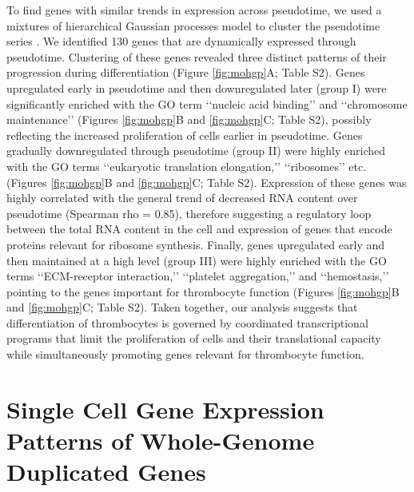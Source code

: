 To find genes with similar trends in expression across pseudotime, we used a mixtures of hierarchical Gaussian processes model to cluster the pseudotime series \cite{Hensman2015-op}. We identified 130 genes that are dynamically expressed through pseudotime. Clustering of these genes revealed three distinct patterns of their progression during differentiation (Figure \ref{fig:mohgp}A; Table S2). Genes upregulated early in pseudotime and then downregulated later (group I) were significantly enriched with the GO term ‘‘nucleic acid binding’’ and ‘‘chromosome maintenance’’ (Figures \ref{fig:mohgp}B and \ref{fig:mohgp}C; Table S2), possibly reflecting the increased proliferation of cells earlier in pseudotime. Genes gradually downregulated through pseudotime (group II) were highly enriched with the GO terms ‘‘eukaryotic translation elongation,’’ ‘‘ribosomes’’ etc. (Figures \ref{fig:mohgp}B and \ref{fig:mohgp}C; Table S2). Expression of these genes was highly correlated with the general trend of decreased RNA content over pseudotime (Spearman rho = 0.85), therefore suggesting a regulatory loop between the total RNA content in the cell and expression of genes that encode proteins relevant for ribosome synthesis. Finally, genes upregulated early and then maintained at a high level (group III) were highly enriched with the GO terms ‘‘ECM-receptor interaction,’’ ‘‘platelet aggregation,’’ and ‘‘hemostasis,’’ pointing to the genes important for thrombocyte function (Figures \ref{fig:mohgp}B and \ref{fig:mohgp}C; Table S2). Taken together, our analysis suggests that differentiation of thrombocytes is governed by coordinated transcriptional programs that limit the proliferation of cells and their translational capacity while simultaneously promoting genes relevant for thrombocyte function.

\section{Single Cell Gene Expression Patterns of Whole-Genome Duplicated Genes}

